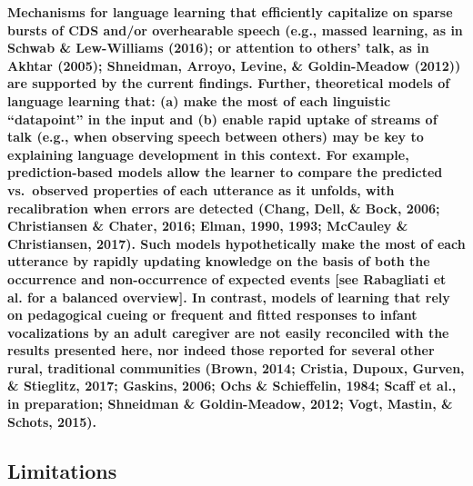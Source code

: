 \documentclass[,man,floatsintext]{apa6}
\begin{document}
\textbf{Mechanisms for language learning that efficiently capitalize on
sparse bursts of CDS and/or overhearable speech (e.g., massed learning,
as in Schwab \& Lew-Williams (2016); or attention to others' talk, as in
Akhtar (2005); Shneidman, Arroyo, Levine, \& Goldin-Meadow (2012)) are
supported by the current findings. Further, theoretical models of
language learning that: (a) make the most of each linguistic
\enquote{datapoint} in the input and (b) enable rapid uptake of streams
of talk (e.g., when observing speech between others) may be key to
explaining language development in this context. For example,
prediction-based models allow the learner to compare the predicted
vs.~observed properties of each utterance as it unfolds, with
recalibration when errors are detected (Chang, Dell, \& Bock, 2006;
Christiansen \& Chater, 2016; Elman, 1990, 1993; McCauley \&
Christiansen, 2017). Such models hypothetically make the most of each
utterance by rapidly updating knowledge on the basis of both the
occurrence and non-occurrence of expected events {[}see Rabagliati et
al. for a balanced overview{]}. In contrast, models of learning that
rely on pedagogical cueing or frequent and fitted responses to infant
vocalizations by an adult caregiver are not easily reconciled with the
results presented here, nor indeed those reported for several other
rural, traditional communities (Brown, 2014; Cristia, Dupoux, Gurven, \&
Stieglitz, 2017; Gaskins, 2006; Ochs \& Schieffelin, 1984; Scaff et al.,
in preparation; Shneidman \& Goldin-Meadow, 2012; Vogt, Mastin, \&
Schots, 2015).}

\subsection{\texorpdfstring{\textbf{Limitations}}{Limitations}}\label{limitations}
\end{document}
